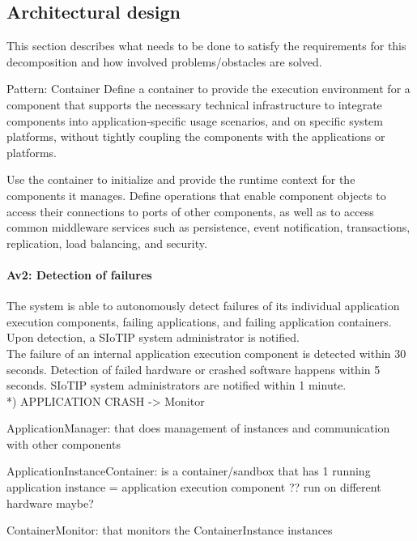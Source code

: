 \subsection{Architectural design}
    This section describes what needs to be done to satisfy the requirements for
    this decomposition and how involved problems/obstacles are solved.

    Pattern: Container
    Define a container to provide the execution environment for a
    component that supports the necessary technical infrastructure
    to integrate components into application-specific usage scenarios,
    and on specific system platforms, without tightly coupling
    the components with the applications or platforms.

    Use the container to initialize and provide the runtime context for the
components it manages. Define operations that enable component
objects to access their connections to ports of other components,
as well as to access common middleware services such as persistence,
event notification, transactions, replication, load balancing,
and security.



    \paragraph{Av2: Detection of failures}
        The system is able to autonomously detect failures of its individual
        application execution components, failing applications, and failing application containers. \\
        Upon detection, a SIoTIP system administrator is notified. \\
        The failure of an internal application execution component is detected within 30 seconds.
        Detection of failed hardware or crashed software happens within 5 seconds.
        SIoTIP system administrators are notified within 1 minute.\\

        *) APPLICATION CRASH
        -> Monitor

        ApplicationManager: that does management of instances and communication with other components

        ApplicationInstanceContainer: is a container/sandbox that has
        1 running application instance
        = application execution component
        ?? run on different hardware maybe?

        ContainerMonitor: that monitors the ContainerInstance instances

